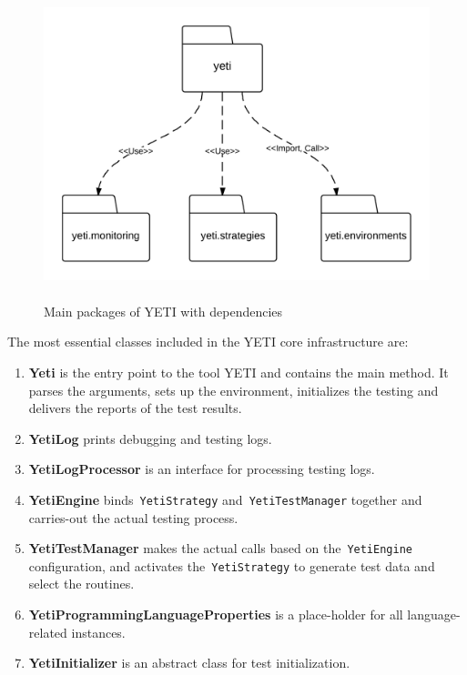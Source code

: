 \bigskip
\begin{figure}[h]
	\centering
	\includegraphics[width=14cm, height=9cm]{chapter3/yetiStructure.png}
	\smallskip
	\caption{Main packages of YETI with dependencies }
	\label{fig:yetiCore}
\end{figure}
\bigskip
\bigskip
\bigskip
The most essential classes included in the YETI core infrastructure are:
\begin{enumerate}
\item {\textbf{Yeti}} is the entry point to the tool YETI and contains the main method. It parses the arguments, sets up the environment, initializes the testing and delivers the reports of the test results.
\item {\textbf{YetiLog}} prints debugging and testing logs. 
\item {\textbf{YetiLogProcessor}} is an interface for processing testing logs.
\item {\textbf{YetiEngine}} binds~\verb+YetiStrategy+ and~\verb+YetiTestManager+ together and carries-out the actual testing process.
\item {\textbf{YetiTestManager}} makes the actual calls based on the~\verb+YetiEngine+ configuration, and activates the~\verb+YetiStrategy+ to generate test data and select the routines.
\item {\textbf{YetiProgrammingLanguageProperties}} is a place-holder for all language-related instances.
\item {\textbf{YetiInitializer}} is an abstract class for test initialization.
\end{enumerate}

